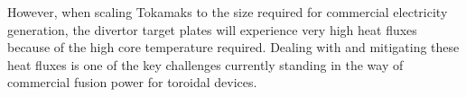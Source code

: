 \documentclass[a4paper, 12pt]{article} %
\begin{document}
%	
	However, when scaling Tokamaks to the size required for commercial electricity generation, the divertor target plates will experience very high heat fluxes because of the high core temperature required.  
	Dealing with and mitigating these heat fluxes is one of the key challenges currently standing in the way of commercial fusion power for toroidal devices\cite{Romanelli2012}. 	 
	
\end{document}
